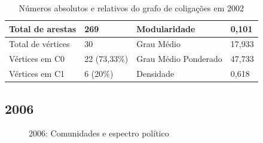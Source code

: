 \begin{table}[H]
\centering
\label{table-2002}
\begin{tabular}{|l|l|l|l|}
\hline
Total de arestas  & 269 & Modularidade         & 0,101 \\ \hline
Total de vértices & 30  & Grau Médio           & 17,933 \\ \hline
Vértices em C0    & 22  (73,33\%) & Grau Médio Ponderado & 47,733 \\ \hline
Vértices em C1    & 6 (20\%) & Densidade            &  0,618\\ \hline
\end{tabular}
\caption{Números absolutos e relativos do grafo de coligações em 2002}
\end{table}

\subsection{2006}
\label{resultados__grafos--2006}

\begin{figure}[H]
\center
    \qquad
    
    \caption{2006: Comunidades e espectro político}
\end{figure}

